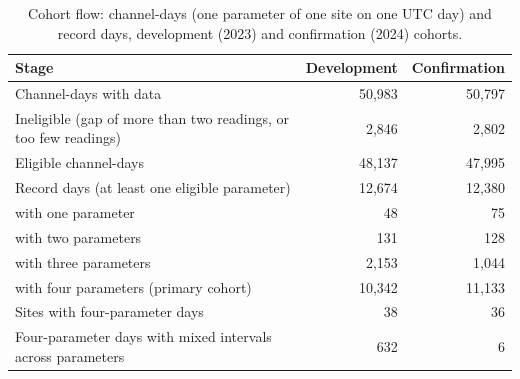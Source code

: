 \documentclass[11pt]{article}
\begin{document}
\begin{table}[h]
\centering
\caption{Cohort flow: channel-days (one parameter of one site on one UTC day) and record days, development (2023) and confirmation (2024) cohorts.}\label{tab:s3}
\small
\begin{tabular}{@{}lrr@{}}
\toprule
Stage & Development & Confirmation \\
\midrule
Channel-days with data & 50,983 & 50,797 \\
Ineligible (gap of more than two readings, or too few readings) & 2,846 & 2,802 \\
Eligible channel-days & 48,137 & 47,995 \\
Record days (at least one eligible parameter) & 12,674 & 12,380 \\
\quad with one parameter & 48 & 75 \\
\quad with two parameters & 131 & 128 \\
\quad with three parameters & 2,153 & 1,044 \\
\quad with four parameters (primary cohort) & 10,342 & 11,133 \\
Sites with four-parameter days & 38 & 36 \\
Four-parameter days with mixed intervals across parameters & 632 & 6 \\
\bottomrule
\end{tabular}
\end{table}
\end{document}
